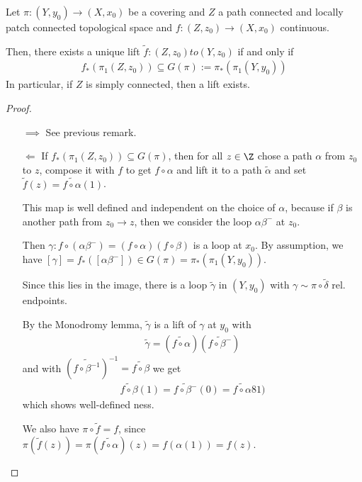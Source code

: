 \begin{thm}\label{thm:lifting-criterion}
  Let $\pi:(Y,y_0) \to  (X,x_0)$ be a covering and $Z$ a path connected and locally patch connected topological space and $f:(Z,z_0) \to  (X,x_0)$ continuous.

  Then, there exists a unique lift $\tilde{f}: (Z,z_0) to   (Y,z_0)$ if and only if
  \begin{align*}
    f_{\ast}(\pi_1(Z,z_0)) \subseteq G(\pi):= \pi_{\ast}(\pi_1(Y,y_0))
  \end{align*}
  In particular, if $Z$ is simply connected, then a lift exists.
\end{thm}
\begin{proof}
\begin{itemize}
  \item[$\implies$] See previous remark.
  \item[$\Leftarrow$] If $f_{\ast}(\pi_1(Z,z_0)) \subseteq G(\pi)$, then for all $z \in \Z$
    chose a path $\alpha$ from $z_0$ to $z$, compose it with $f$ to get $f \circ \alpha$ and lift it to a path $\tilde{\alpha}$ and set $\tilde{f}(z) = \tilde{f \circ \alpha}(1)$.


    This map is well defined and independent on the choice of $\alpha$, because if $\beta$ is another path from $z_0 \to z$, then we consider the loop $\alpha \beta^{-}$ at $z_0$.

    Then $\gamma: f \circ (\alpha \beta^{-}) = (f \circ \alpha)(f \circ \beta)$ is a loop at $x_0$.
    By assumption, we have $[\gamma] = f_{\ast}([\alpha \beta^{-}]) \in G(\pi) = \pi_{\ast}(\pi_1(Y,y_0))$.

    Since this lies in the image, there is a loop $\tilde{\gamma}$ in $(Y,y_0)$ with $\gamma \sim \pi \circ \tilde{\delta}$ rel. endpoints.

    By the Monodromy lemma, $\tilde{\gamma}$ is a lift of $\gamma$ at $y_0$ with 
    \begin{align*}
      \tilde{\gamma} = (\tilde{f \circ \alpha})(\tilde{f \circ \beta^{-}})
    \end{align*}
    and with $(\tilde{f \circ \beta^{-1}})^{-1} = \tilde{f \circ \beta}$ we get
    \begin{align*}
      \tilde{f \circ \beta}(1) = \tilde{f \circ \beta^{-}}(0) = \tilde{f \circ \alpha}81)
    \end{align*}
    which shows well-defined ness.

    We also have $\pi \circ \tilde{f} = f$, since $\pi(\tilde{f}(z)) = \pi(\tilde{f \circ \alpha})(z) = f(\alpha(1)) = f(z)$.


\end{itemize}
\end{proof}
